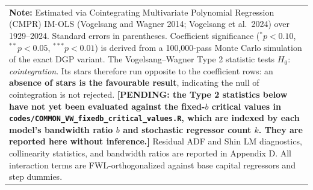 \begin{table}[H]
\begin{tabular}{p{3.8cm}p{1.1cm}p{1.1cm}p{1.1cm}p{1.1cm}p{1.1cm}p{1.1cm}}
\multicolumn{7}{p{15cm}}{\footnotesize \textbf{Note:} Estimated via Cointegrating Multivariate Polynomial Regression (CMPR) IM-OLS (Vogelsang and Wagner 2014; Vogelsang et al.\ 2024) over 1929--2024. Standard errors in parentheses. Coefficient significance ($^* p < 0.10$, $^{**} p < 0.05$, $^{***} p < 0.01$) is derived from a 100,000-pass Monte Carlo simulation of the exact DGP variant. The Vogelsang--Wagner Type 2 statistic tests $H_0$: \emph{cointegration}. Its stars therefore run opposite to the coefficient rows: an \textbf{absence of stars is the favourable result}, indicating the null of cointegration is not rejected. \textbf{[PENDING: the Type 2 statistics below have not yet been evaluated against the fixed-$b$ critical values in \texttt{codes/COMMON\_VW\_fixedb\_critical\_values.R}, which are indexed by each model's bandwidth ratio $b$ and stochastic regressor count $k$. They are reported here without inference.]} Residual ADF and Shin LM diagnostics, collinearity statistics, and bandwidth ratios are reported in Appendix D. All interaction terms are FWL-orthogonalized against base capital regressors and step dummies.} \\
\end{tabular}
\end{table}
